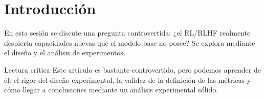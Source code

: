\section{Introducción}
En esta sesión se discute una pregunta controvertida: ¿el RL/RLHF realmente despierta capacidades nuevas que el modelo base no posee? Se explora mediante el diseño y el análisis de experimentos.

\begin{knowledgebox}{Lectura crítica}
Este artículo es bastante controvertido, pero podemos aprender de él: el rigor del diseño experimental, la validez de la definición de las métricas y cómo llegar a conclusiones mediante un análisis experimental sólido.
\end{knowledgebox}

